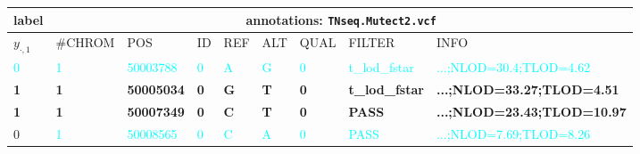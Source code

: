 \tiny
\setlength{\tabcolsep}{3pt}
\begin{tabular}{|l|llllllll|}
\hline
\footnotesize label &
\multicolumn{8}{|c|}{\footnotesize annotations: \texttt{TNseq.Mutect2.vcf}} \\
\hline
\(y_{\cdot,1}\) & \#CHROM & POS & ID & REF & ALT & QUAL & FILTER & INFO \\
\textcolor{cyan}{0} &
\textcolor{cyan}{1} &
\textcolor{cyan}{50003788} &
\textcolor{cyan}{0} &
\textcolor{cyan}{A} &
\textcolor{cyan}{G} &
\textcolor{cyan}{0} &
\textcolor{cyan}{t\_lod\_fstar} &
\textcolor{cyan}{...;NLOD=30.4;TLOD=4.62} \\
\bfseries \textcolor{cyan!50!brown}{1} &
\bfseries \textcolor{cyan!50!brown}{1} &
\bfseries \textcolor{cyan!50!brown}{50005034} &
\bfseries \textcolor{cyan!50!brown}{0} &
\bfseries \textcolor{cyan!50!brown}{G} &
\bfseries \textcolor{cyan!50!brown}{T} &
\bfseries \textcolor{cyan!50!brown}{0} &
\bfseries \textcolor{cyan!50!brown}{t\_lod\_fstar} &
\bfseries \textcolor{cyan!50!brown}{...;NLOD=33.27;TLOD=4.51} \\
\bfseries \textcolor{cyan!50!brown}{1} &
\bfseries \textcolor{cyan!50!brown}{1} &
\bfseries \textcolor{cyan!50!brown}{50007349} &
\bfseries \textcolor{cyan!50!brown}{0} &
\bfseries \textcolor{cyan!50!brown}{C} &
\bfseries \textcolor{cyan!50!brown}{T} &
\bfseries \textcolor{cyan!50!brown}{0} &
\bfseries \textcolor{cyan!50!brown}{PASS} &
\bfseries \textcolor{cyan!50!brown}{...;NLOD=23.43;TLOD=10.97} \\
\textcolor{cyan!50!brown}{0} &
\textcolor{cyan}{1} &
\textcolor{cyan}{50008565} &
\textcolor{cyan}{0} &
\textcolor{cyan}{C} &
\textcolor{cyan}{A} &
\textcolor{cyan}{0} &
\textcolor{cyan}{PASS} &
\textcolor{cyan}{...;NLOD=7.69;TLOD=8.26} \\
\hline
\end{tabular}
\tiny
\\[1em]
